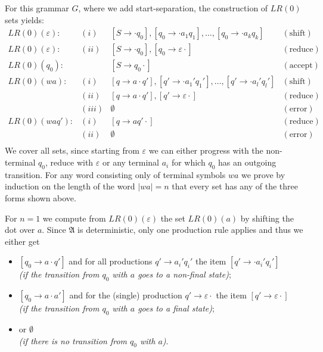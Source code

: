 \begin{solution}
For this grammar $G$, where we add start-separation, the construction of $LR(0)$ sets yields:
\[
\begin{array}{lcll}
LR(0)(\varepsilon): & (i)   & {[S \to \cdot q_0], [q_0 \to \cdot a_1 q_1], \hdots, [q_0 \to \cdot a_k q_k]} & (\text{shift}) \\
LR(0)(\varepsilon): & (ii)  & {[S \to \cdot q_0], [q_0 \to \varepsilon \cdot]} & (\text{reduce}) \\
LR(0)(q_0):         &       & {[S \to q_0 \cdot ]} & (\text{accept}) \\
LR(0)(w a):         & (i)   & {[q \to a \cdot q'], [q' \to \cdot a_1' q_1'], \hdots, [q' \to \cdot a_l' q_l'] } & (\text{shift}) \\
                    & (ii)  & {[q \to a \cdot q'], [q' \to \varepsilon \cdot]} & (\text{reduce})\\
                    & (iii) & \emptyset & (\text{error})\\
LR(0)(w a q'):      & (i)   & {[q \to a q' \cdot]} & (\text{reduce})\\
                    & (ii)  & \emptyset & (\text{error})\\
\end{array}
\]
We cover all sets, since starting from $\varepsilon$ we can either progress with the non-terminal $q_0$, reduce with $\varepsilon$ or any terminal $a_i$ for which $q_0$ has an outgoing transition. For any word consisting only of terminal symbols $wa$ we prove by induction on the length of the word $|wa|=n$ that every set has any of the three forms shown above. 

For $n=1$ we compute from $LR(0)(\varepsilon)$ the set $LR(0)(a)$ by shifting the dot over $a$. Since $\mathfrak{A}$ is deterministic, only one production rule applies and thus we either get 
\begin{itemize}
    \item $[q_0 \to a \cdot q']$ and for all productions $q' \to a_i' q_i'$ the item $[q' \to \cdot a_i' q_i']$\\
    \emph{(if the transition from $q_0$ with $a$ goes to a non-final state)};
    \item $[q_0 \to a \cdot a']$ and for the (single) production $q' \to \varepsilon \cdot$ the item $[q' \to \varepsilon \cdot ]$\\
    \emph{(if the transition from $q_0$ with $a$ goes to a final state)};
    \item or $\emptyset$\\
    \emph{(if there is no transition from $q_0$ with $a$)}.
\end{itemize}


\end{solution}

